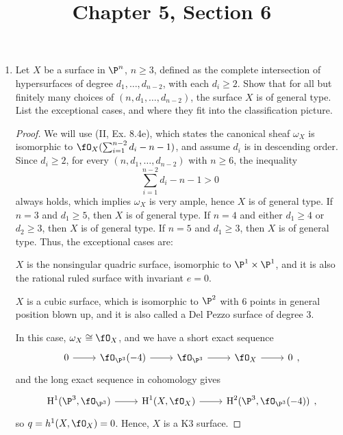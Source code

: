 \documentclass[a4paper]{article}
\title{Chapter 5, Section 6}
\begin{document}
\maketitle

\begin{enumerate} [label=\textbf{\arabic*.}, leftmargin=0em]

      \item Let $X$ be a surface in $\P^n$, $n \geq 3$, defined as the complete intersection of hypersurfaces of degree $d_1, \dots, d_{n - 2}$, with each $d_i \geq 2$.
            Show that for all but finitely many choices of $(n, d_1, \dots, d_{n - 2})$, the surface $X$ is of general type.
            List the exceptional cases, and where they fit into the classification picture.

            \begin{proof}
                  We will use (II, Ex. 8.4e), which states the canonical sheaf $\omega_X$ is isomorphic to $\fO_X(\sum_{i = 1}^{n - 2} d_i - n - 1)$, and assume $d_i$ is in descending order.
                  Since $d_i \geq 2$, for every $(n, d_1, \dots, d_{n - 2})$ with $n \geq 6$, the inequality $$\sum^{n - 2}_{i = 1} d_i - n - 1 > 0$$ always holds, which implies $\omega_X$ is very ample, hence $X$ is of general type.
                  If $n = 3$ and $d_1 \geq 5$, then $X$ is of general type.
                  If $n = 4$ and either $d_1 \geq 4$ or $d_2 \geq 3$, then $X$ is of general type.
                  If $n = 5$ and $d_1 \geq 3$, then $X$ is of general type.
                  Thus, the exceptional cases are:

                   $X$ is the nonsingular quadric surface, isomorphic to $\P^1 \times \P^1$, and it is also the rational ruled surface with invariant $e = 0$.

                   $X$ is a cubic surface, which is isomorphic to $\P^2$ with 6 points in general position blown up, and it is also called a Del Pezzo surface of degree 3.

                   In this case, $\omega_X \cong \fO_X$, and we have a short exact sequence
                  \[ \begin{tikzcd}
                              0 \arrow[r] & \fO_{\P^3}(-4) \arrow[r] & \fO_{\P^3} \arrow[r] & \fO_{X} \arrow[r] & 0
                        \end{tikzcd} ,\]
                  and the long exact sequence in cohomology gives
                  \[ \begin{tikzcd}
                              \cH^1(\P^3, \fO_{\P^3}) \arrow[r] & \cH^1(X, \fO_X) \arrow[r] & \cH^2(\P^3, \fO_{\P^3}(-4))
                        \end{tikzcd}, \]
                  so $q = h^1(X, \fO_X) = 0$.
                  Hence, $X$ is a K3 surface.


\end{proof}
\end{enumerate}
\end{document}
